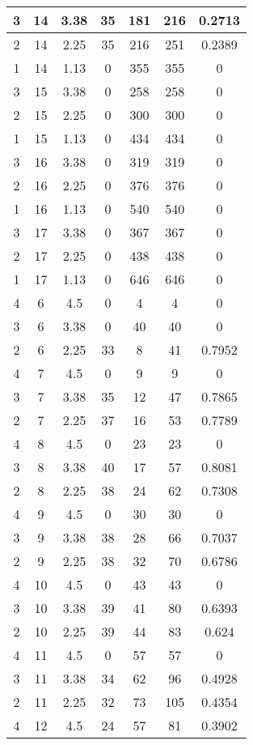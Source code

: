 \documentclass[letterpaper, 12pt]{article}
\begin{document}
\begin{longtable}{|c|c|c|c|c|c|c|}
\hline
3 & 14 & 3.38 & 35 & 181 & 216 & 0.2713 \\
\hline
2 & 14 & 2.25 & 35 & 216 & 251 & 0.2389 \\
\hline
1 & 14 & 1.13 & 0 & 355 & 355 & 0 \\
\hline
3 & 15 & 3.38 & 0 & 258 & 258 & 0 \\
\hline
2 & 15 & 2.25 & 0 & 300 & 300 & 0 \\
\hline
1 & 15 & 1.13 & 0 & 434 & 434 & 0 \\
\hline
3 & 16 & 3.38 & 0 & 319 & 319 & 0 \\
\hline
2 & 16 & 2.25 & 0 & 376 & 376 & 0 \\
\hline
1 & 16 & 1.13 & 0 & 540 & 540 & 0 \\
\hline
3 & 17 & 3.38 & 0 & 367 & 367 & 0 \\
\hline
2 & 17 & 2.25 & 0 & 438 & 438 & 0 \\
\hline
1 & 17 & 1.13 & 0 & 646 & 646 & 0 \\
\hline
4 & 6 & 4.5 & 0 & 4 & 4 & 0 \\
\hline
3 & 6 & 3.38 & 0 & 40 & 40 & 0 \\
\hline
2 & 6 & 2.25 & 33 & 8 & 41 & 0.7952 \\
\hline
4 & 7 & 4.5 & 0 & 9 & 9 & 0 \\
\hline
3 & 7 & 3.38 & 35 & 12 & 47 & 0.7865 \\
\hline
2 & 7 & 2.25 & 37 & 16 & 53 & 0.7789 \\
\hline
4 & 8 & 4.5 & 0 & 23 & 23 & 0 \\
\hline
3 & 8 & 3.38 & 40 & 17 & 57 & 0.8081 \\
\hline
2 & 8 & 2.25 & 38 & 24 & 62 & 0.7308 \\
\hline
4 & 9 & 4.5 & 0 & 30 & 30 & 0 \\
\hline
3 & 9 & 3.38 & 38 & 28 & 66 & 0.7037 \\
\hline
2 & 9 & 2.25 & 38 & 32 & 70 & 0.6786 \\
\hline
4 & 10 & 4.5 & 0 & 43 & 43 & 0 \\
\hline
3 & 10 & 3.38 & 39 & 41 & 80 & 0.6393 \\
\hline
2 & 10 & 2.25 & 39 & 44 & 83 & 0.624 \\
\hline
4 & 11 & 4.5 & 0 & 57 & 57 & 0 \\
\hline
3 & 11 & 3.38 & 34 & 62 & 96 & 0.4928 \\
\hline
2 & 11 & 2.25 & 32 & 73 & 105 & 0.4354 \\
\hline
4 & 12 & 4.5 & 24 & 57 & 81 & 0.3902 \\

\end{longtable}
\end{document}
